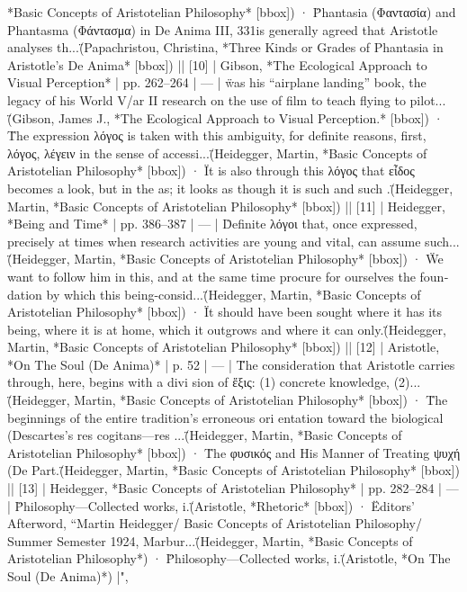 {{*Basic Concepts of Aristotelian Philosophy* [bbox]) · \"Phantasia (Φαντασία) and Phantasma (Φάντασμα) in De Anima III, 331\n\nIt is generally agreed that Aristotle analyses th...\" (Papachristou, Christina, *Three Kinds or Grades of Phantasia in Aristotle's De Anima* [bbox]) |\n| [10] | Gibson, *The Ecological Approach to Visual Perception* | pp. 262–264 | — | \"was his “airplane landing” book, the legacy of his World V/ar II research on the use of film to teach flying to pilot...\" (Gibson, James J., *The Ecological Approach to Visual Perception.* [bbox]) · \"The expression λόγος is taken with this ambiguity, for definite reasons, first, λόγος, λέγειν in the sense of accessi...\" (Heidegger, Martin, *Basic Concepts of Aristotelian Philosophy* [bbox]) · \"It is also through this λόγος that εἶδος becomes a look, but in the as; it looks as though it is such and such .\" (Heidegger, Martin, *Basic Concepts of Aristotelian Philosophy* [bbox]) |\n| [11] | Heidegger, *Being and Time* | pp. 386–387 | — | \"Definite λόγοι that, once expressed, precisely at times when research activities are young and vital, can assume such...\" (Heidegger, Martin, *Basic Concepts of Aristotelian Philosophy* [bbox]) · \"We want to follow him in this, and at the same time procure for ourselves the foun­ dation by which this being-consid...\" (Heidegger, Martin, *Basic Concepts of Aristotelian Philosophy* [bbox]) · \"It should have been sought where it has its being, where it is at home, which it outgrows and where it can only\n{}.\" (Heidegger, Martin, *Basic Concepts of Aristotelian Philosophy* [bbox]) |\n| [12] | Aristotle, *On The Soul (De Anima)* | p. 52 | — | \"The consideration that Aristotle carries through, here, begins with a divi­ sion of ἕξις: (1) concrete knowledge, (2)...\" (Heidegger, Martin, *Basic Concepts of Aristotelian Philosophy* [bbox]) · \"The beginnings of the entire tradition’s erroneous ori­ entation toward the biological (Descartes’s res cogitans—res ...\" (Heidegger, Martin, *Basic Concepts of Aristotelian Philosophy* [bbox]) · \"The φυσικός and His Manner of Treating ψυχή (De Part.\" (Heidegger, Martin, *Basic Concepts of Aristotelian Philosophy* [bbox]) |\n| [13] | Heidegger, *Basic Concepts of Aristotelian Philosophy* | pp. 282–284 | — | \"Philosophy—Collected works, i.\" (Aristotle, *Rhetoric* [bbox]) · \"Editors' Afterword\n\ntitle, “Martin Heidegger/ Basic Concepts of Aristotelian Philosophy/ Summer Semester 1924, Marbur...\" (Heidegger, Martin, *Basic Concepts of Aristotelian Philosophy*) · \"Philosophy—Collected works, i.\" (Aristotle, *On The Soul (De Anima)*) |\n",
}}
